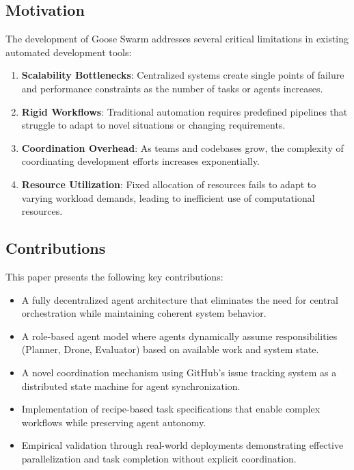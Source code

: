 \documentclass[11pt,a4paper]{article}
\begin{document}
\subsection{Motivation}

The development of Goose Swarm addresses several critical limitations in existing automated development tools:

\begin{enumerate}
    \item \textbf{Scalability Bottlenecks}: Centralized systems create single points of failure and performance constraints as the number of tasks or agents increases.
    
    \item \textbf{Rigid Workflows}: Traditional automation requires predefined pipelines that struggle to adapt to novel situations or changing requirements.
    
    \item \textbf{Coordination Overhead}: As teams and codebases grow, the complexity of coordinating development efforts increases exponentially.
    
    \item \textbf{Resource Utilization}: Fixed allocation of resources fails to adapt to varying workload demands, leading to inefficient use of computational resources.
\end{enumerate}

\subsection{Contributions}

This paper presents the following key contributions:

\begin{itemize}
    \item A fully decentralized agent architecture that eliminates the need for central orchestration while maintaining coherent system behavior.
    
    \item A role-based agent model where agents dynamically assume responsibilities (Planner, Drone, Evaluator) based on available work and system state.
    
    \item A novel coordination mechanism using GitHub's issue tracking system as a distributed state machine for agent synchronization.
    
    \item Implementation of recipe-based task specifications that enable complex workflows while preserving agent autonomy.
    
    \item Empirical validation through real-world deployments demonstrating effective parallelization and task completion without explicit coordination.
\end{itemize}
\end{document}
